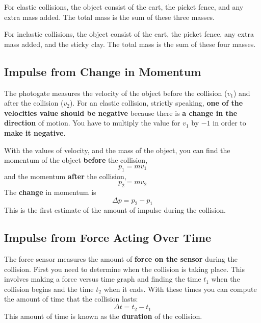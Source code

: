 For elastic collisions, the object consist of the cart, the picket fence, and any extra mass added. The total mass is the sum of these three masses.

For inelastic collisions, the object consist of the cart, the picket fence, any extra mass added, and the sticky clay. The total mass is the sum of these four masses.
\subsection{Impulse from Change in Momentum}
The photogate measures the velocity of the object before the collision ($v_{1}$) and after the collision ($v_{2}$). For an elastic collision, strictly speaking, \textbf{one of the velocities value should be negative} because there is \textbf{a change in the direction} of motion. You have to multiply the value for $v_{1}$ by $-1$ in order to \textbf{make it negative}.

With the values of velocity, and the mass of the object, you can find the momentum of the object \textbf{before} the collision,
\begin{equation}
    p_{1} = m v_{1}
\end{equation}
and the momentum \textbf{after} the collision,
\begin{equation}
    p_{2} = m v_{2}
\end{equation}
The \textbf{change} in momentum is
\begin{equation}
    \Delta p = p_{2} - p_{1}
\end{equation}
This is the first estimate of the amount of impulse during the collision.
\subsection{Impulse from Force Acting Over Time}
The force sensor measures the amount of \textbf{force on the sensor} during the collision. First you need to determine when the collision is taking place. This involves making a force versus time graph and finding the time $t_{1}$ when the collision begins and the time $t_{2}$ when it ends. With these times you can compute the amount of time that the collision lasts:
\begin{equation}
    \Delta t = t_{2} - t_{1}
\end{equation}
This amount of time is known as the \textbf{duration} of the collision.

